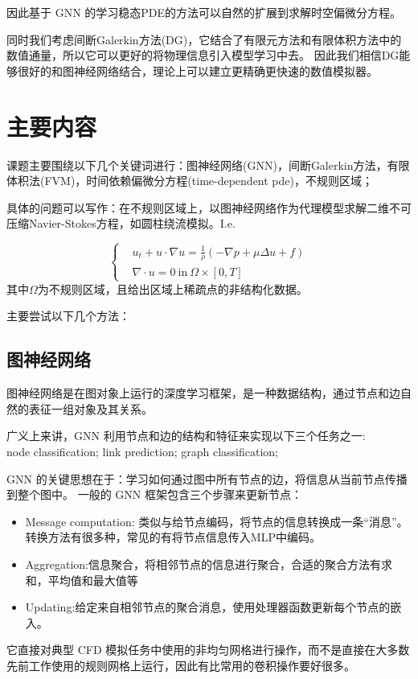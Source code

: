 因此基于 GNN 的学习稳态PDE的方法可以自然的扩展到求解时空偏微分方程。

同时我们考虑间断Galerkin方法(DG)，它结合了有限元方法和有限体积方法中的数值通量，所以它可以更好的将物理信息引入模型学习中去。
因此我们相信DG能够很好的和图神经网络结合，理论上可以建立更精确更快速的数值模拟器。



\section{主要内容}
课题主要围绕以下几个关键词进行：图神经网络(GNN)，间断Galerkin方法，有限体积法(FVM)，时间依赖偏微分方程(time-dependent pde)，不规则区域；

具体的问题可以写作：在不规则区域上，以图神经网络作为代理模型求解二维不可压缩Navier-Stokes方程，如圆柱绕流模拟。I.e.

$$\left\{\begin{aligned} 
    &u_t+u\cdot \nabla u=\frac{1}{\rho}(-\nabla p+\mu \Delta u + f)\\
    &\nabla \cdot u=0\ \text{in}\ \Omega\times [0,T]
\end{aligned}\right.$$
其中$\Omega$为不规则区域，且给出区域上稀疏点的非结构化数据。

主要尝试以下几个方法：
\subsection{图神经网络}
图神经网络是在图对象上运行的深度学习框架，是一种数据结构，通过节点和边自然的表征一组对象及其关系。

广义上来讲，GNN 利用节点和边的结构和特征来实现以下三个任务之一:\\
node classification; link prediction; graph classification;

GNN 的关键思想在于：学习如何通过图中所有节点的边，将信息从当前节点传播到整个图中。
一般的 GNN 框架包含三个步骤来更新节点：
\begin{itemize}
    \item Message computation: 类似与给节点编码，将节点的信息转换成一条“消息”。转换方法有很多种，常见的有将节点信息传入MLP中编码。
    \item Aggregation:信息聚合，将相邻节点的信息进行聚合，合适的聚合方法有求和，平均值和最大值等
    \item Updating:给定来自相邻节点的聚合消息，使用处理器函数更新每个节点的嵌入。
\end{itemize}
它直接对典型 CFD 模拟任务中使用的非均匀网格进行操作，而不是直接在大多数先前工作使用的规则网格上运行，因此有比常用的卷积操作要好很多。

